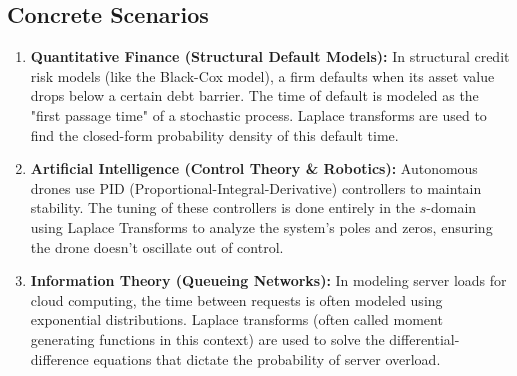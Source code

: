 \documentclass[11pt, a4paper]{article}
\theoremstyle{definition}
\theoremstyle{remark}
\begin{document}
\subsection{Concrete Scenarios}
\begin{enumerate}
    \item \textbf{Quantitative Finance (Structural Default Models):} In structural credit risk models (like the Black-Cox model), a firm defaults when its asset value drops below a certain debt barrier. The time of default is modeled as the "first passage time" of a stochastic process. Laplace transforms are used to find the closed-form probability density of this default time.
    \item \textbf{Artificial Intelligence (Control Theory \& Robotics):} Autonomous drones use PID (Proportional-Integral-Derivative) controllers to maintain stability. The tuning of these controllers is done entirely in the $s$-domain using Laplace Transforms to analyze the system's poles and zeros, ensuring the drone doesn't oscillate out of control.
    \item \textbf{Information Theory (Queueing Networks):} In modeling server loads for cloud computing, the time between requests is often modeled using exponential distributions. Laplace transforms (often called moment generating functions in this context) are used to solve the differential-difference equations that dictate the probability of server overload.
\end{enumerate}
\end{document}
